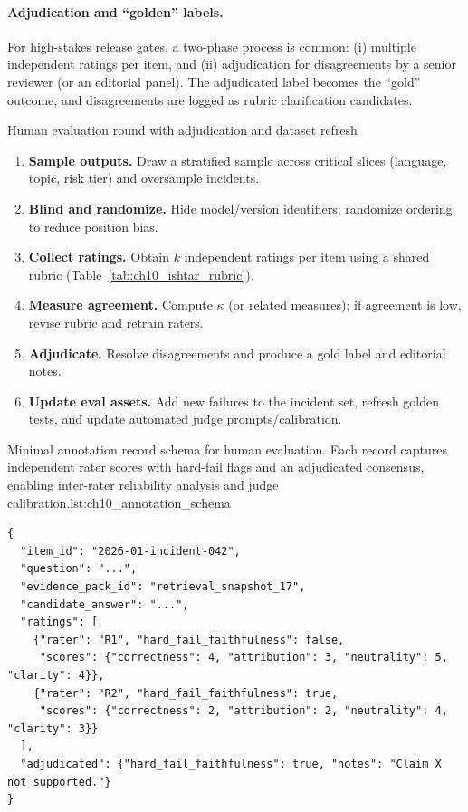 \paragraph{Adjudication and ``golden'' labels.}
For high-stakes release gates, a two-phase process is common:
(i) multiple independent ratings per item, and
(ii) adjudication for disagreements by a senior reviewer (or an editorial panel).
The adjudicated label becomes the ``gold'' outcome, and disagreements are logged as rubric clarification candidates.

\begin{llmalgobox}{Human evaluation round with adjudication and dataset refresh}
\label{alg:ch10_hitl_round}
\begin{enumerate}[leftmargin=1.6em, itemsep=3pt]
    \item \textbf{Sample outputs.} Draw a stratified sample across critical slices (language, topic, risk tier) and oversample incidents.
    \item \textbf{Blind and randomize.} Hide model/version identifiers; randomize ordering to reduce position bias.
    \item \textbf{Collect ratings.} Obtain $k$ independent ratings per item using a shared rubric (Table~\ref{tab:ch10_ishtar_rubric}).
    \item \textbf{Measure agreement.} Compute $\kappa$ (or related measures); if agreement is low, revise rubric and retrain raters.
    \item \textbf{Adjudicate.} Resolve disagreements and produce a gold label and editorial notes.
    \item \textbf{Update eval assets.} Add new failures to the incident set, refresh golden tests, and update automated judge prompts/calibration.
\end{enumerate}
\end{llmalgobox}

\begin{codebox}{Minimal annotation record schema for human evaluation. Each record captures independent rater scores with hard-fail flags and an adjudicated consensus, enabling inter-rater reliability analysis and judge calibration.}{lst:ch10_annotation_schema}
\begin{verbatim}
{
  "item_id": "2026-01-incident-042",
  "question": "...",
  "evidence_pack_id": "retrieval_snapshot_17",
  "candidate_answer": "...",
  "ratings": [
    {"rater": "R1", "hard_fail_faithfulness": false,
     "scores": {"correctness": 4, "attribution": 3, "neutrality": 5, "clarity": 4}},
    {"rater": "R2", "hard_fail_faithfulness": true,
     "scores": {"correctness": 2, "attribution": 2, "neutrality": 4, "clarity": 3}}
  ],
  "adjudicated": {"hard_fail_faithfulness": true, "notes": "Claim X not supported."}
}
\end{verbatim}
\end{codebox}

